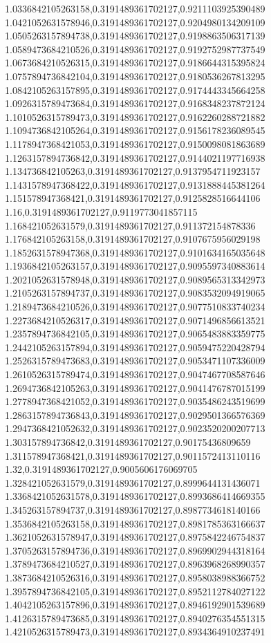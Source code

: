 1.0336842105263158,0.3191489361702127,0.9211103925390489
1.0421052631578946,0.3191489361702127,0.9204980134209109
1.0505263157894738,0.3191489361702127,0.9198863506317139
1.0589473684210526,0.3191489361702127,0.9192752987737549
1.0673684210526315,0.3191489361702127,0.9186644315395824
1.0757894736842104,0.3191489361702127,0.9180536267813295
1.0842105263157895,0.3191489361702127,0.9174443345664258
1.0926315789473684,0.3191489361702127,0.9168348237872124
1.1010526315789473,0.3191489361702127,0.9162260288721882
1.1094736842105264,0.3191489361702127,0.9156178236089545
1.1178947368421053,0.3191489361702127,0.9150098081863689
1.1263157894736842,0.3191489361702127,0.9144021197716938
1.134736842105263,0.3191489361702127,0.9137954711923157
1.1431578947368422,0.3191489361702127,0.9131888445381264
1.151578947368421,0.3191489361702127,0.9125828516644106
1.16,0.3191489361702127,0.9119773041857115
1.168421052631579,0.3191489361702127,0.911372154878336
1.176842105263158,0.3191489361702127,0.9107675956029198
1.1852631578947368,0.3191489361702127,0.9101634165035648
1.1936842105263157,0.3191489361702127,0.9095597340883614
1.2021052631578948,0.3191489361702127,0.9089565313342973
1.2105263157894737,0.3191489361702127,0.9083532094919065
1.2189473684210526,0.3191489361702127,0.9077510833740234
1.2273684210526317,0.3191489361702127,0.9071496856613521
1.2357894736842105,0.3191489361702127,0.9065483883359775
1.2442105263157894,0.3191489361702127,0.9059475220428794
1.2526315789473683,0.3191489361702127,0.9053471107336009
1.2610526315789474,0.3191489361702127,0.9047467708587646
1.2694736842105263,0.3191489361702127,0.9041476787015199
1.2778947368421052,0.3191489361702127,0.9035486243519699
1.2863157894736843,0.3191489361702127,0.9029501366576369
1.2947368421052632,0.3191489361702127,0.9023520200207713
1.303157894736842,0.3191489361702127,0.90175436809659
1.311578947368421,0.3191489361702127,0.9011572413110116
1.32,0.3191489361702127,0.9005606176069705
1.328421052631579,0.3191489361702127,0.8999644131436071
1.3368421052631578,0.3191489361702127,0.8993686414669355
1.345263157894737,0.3191489361702127,0.8987734618140166
1.3536842105263158,0.3191489361702127,0.8981785363166637
1.3621052631578947,0.3191489361702127,0.8975842246754837
1.3705263157894736,0.3191489361702127,0.8969902944318164
1.3789473684210527,0.3191489361702127,0.8963968268990357
1.3873684210526316,0.3191489361702127,0.8958038988366752
1.3957894736842105,0.3191489361702127,0.8952112784027122
1.4042105263157896,0.3191489361702127,0.8946192901539689
1.4126315789473685,0.3191489361702127,0.8940276354551315
1.4210526315789473,0.3191489361702127,0.8934364910237491
